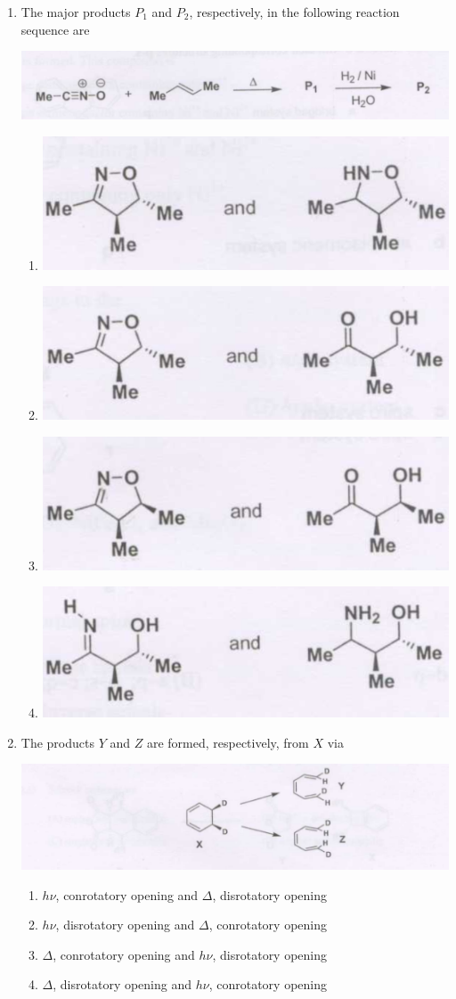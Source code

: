\documentclass[12pt]{article}
\begin{document}
\begin{enumerate}
\item The major products $P_1$ and $P_2$, respectively, in the following reaction sequence are

\begin{center}
    \includegraphics[width=0.5\columnwidth]{figs/q39.png}
\end{center}    \hfill{}
\begin{enumerate}
    \item \includegraphics[width=0.3\columnwidth]{figs/q39 a.png}
    \item \includegraphics[width=0.3\columnwidth]{figs/q39 b.png}
    \item \includegraphics[width=0.3\columnwidth]{figs/q39 c.png}
    \item \includegraphics[width=0.3\columnwidth]{figs/q39 d.png}
\end{enumerate}

\item The products $Y$ and $Z$ are formed, respectively, from $X$ via

\begin{center}
    \includegraphics[width=0.8\columnwidth]{figs/q40.png}
\end{center}
\begin{enumerate}
    \item $h\nu$, conrotatory opening and $\Delta$, disrotatory opening
    \item $h\nu$, disrotatory opening and $\Delta$, conrotatory opening
    \item $\Delta$, conrotatory opening and $h\nu$, disrotatory opening
    \item $\Delta$, disrotatory opening and $h\nu$, conrotatory opening
\end{enumerate}    \hfill{}




\end{enumerate}
\end{document}
